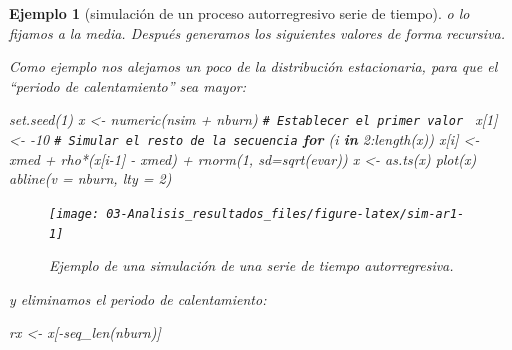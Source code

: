 \documentclass[
  10pt,
]{book}
\newenvironment{Shaded}{\begin{snugshade}}{\end{snugshade}}
\newcommand{\AttributeTok}[1]{\textcolor[rgb]{0.77,0.63,0.00}{#1}}
\newcommand{\CommentTok}[1]{\textcolor[rgb]{0.56,0.35,0.01}{\textit{#1}}}
\newcommand{\ControlFlowTok}[1]{\textcolor[rgb]{0.13,0.29,0.53}{\textbf{#1}}}
\newcommand{\DecValTok}[1]{\textcolor[rgb]{0.00,0.00,0.81}{#1}}
\newcommand{\FunctionTok}[1]{\textcolor[rgb]{0.00,0.00,0.00}{#1}}
\newcommand{\NormalTok}[1]{#1}
\newcommand{\OtherTok}[1]{\textcolor[rgb]{0.56,0.35,0.01}{#1}}
\newcommand{\SpecialCharTok}[1]{\textcolor[rgb]{0.00,0.00,0.00}{#1}}
\theoremstyle{break}
\newtheorem{example}{Ejemplo}[chapter]
\theoremstyle{nonumberplain}
\renewcommand{\CommentTok}[1]{\textcolor[rgb]{0.41,0.41,0.41}{\texttt{#1}}}
\begin{document}
\begin{example}[simulación de un proceso autorregresivo serie de tiempo]
o lo fijamos a la media.
Después generamos los siguientes valores de forma recursiva.

Como ejemplo nos alejamos un poco de la distribución estacionaria, para que el ``periodo de calentamiento'' sea mayor:

\begin{Shaded}
\begin{Highlighting}[]
\FunctionTok{set.seed}\NormalTok{(}\DecValTok{1}\NormalTok{)}
\NormalTok{x }\OtherTok{\textless{}{-}} \FunctionTok{numeric}\NormalTok{(nsim }\SpecialCharTok{+}\NormalTok{ nburn)}
\CommentTok{\# Establecer el primer valor }
\NormalTok{x[}\DecValTok{1}\NormalTok{] }\OtherTok{\textless{}{-}} \SpecialCharTok{{-}}\DecValTok{10}
\CommentTok{\# Simular el resto de la secuencia}
\ControlFlowTok{for}\NormalTok{ (i }\ControlFlowTok{in} \DecValTok{2}\SpecialCharTok{:}\FunctionTok{length}\NormalTok{(x))}
\NormalTok{  x[i] }\OtherTok{\textless{}{-}}\NormalTok{ xmed }\SpecialCharTok{+}\NormalTok{ rho}\SpecialCharTok{*}\NormalTok{(x[i}\DecValTok{{-}1}\NormalTok{] }\SpecialCharTok{{-}}\NormalTok{ xmed) }\SpecialCharTok{+} \FunctionTok{rnorm}\NormalTok{(}\DecValTok{1}\NormalTok{, }\AttributeTok{sd=}\FunctionTok{sqrt}\NormalTok{(evar))}
\NormalTok{x }\OtherTok{\textless{}{-}} \FunctionTok{as.ts}\NormalTok{(x)}
\FunctionTok{plot}\NormalTok{(x)}
\FunctionTok{abline}\NormalTok{(}\AttributeTok{v =}\NormalTok{ nburn, }\AttributeTok{lty =} \DecValTok{2}\NormalTok{)}
\end{Highlighting}
\end{Shaded}

\begin{figure}[!htbp]

{\centering \texttt{[image: 03-Analisis\_resultados\_files/figure-latex/sim-ar1-1]} 

}

\caption{Ejemplo de una simulación de una serie de tiempo autorregresiva.}\label{fig:sim-ar1}
\end{figure}

y eliminamos el periodo de calentamiento:

\begin{Shaded}
\begin{Highlighting}[]
\NormalTok{rx }\OtherTok{\textless{}{-}}\NormalTok{ x[}\SpecialCharTok{{-}}\FunctionTok{seq\_len}\NormalTok{(nburn)]}
\end{Highlighting}
\end{Shaded}

\end{example}
\end{document}

